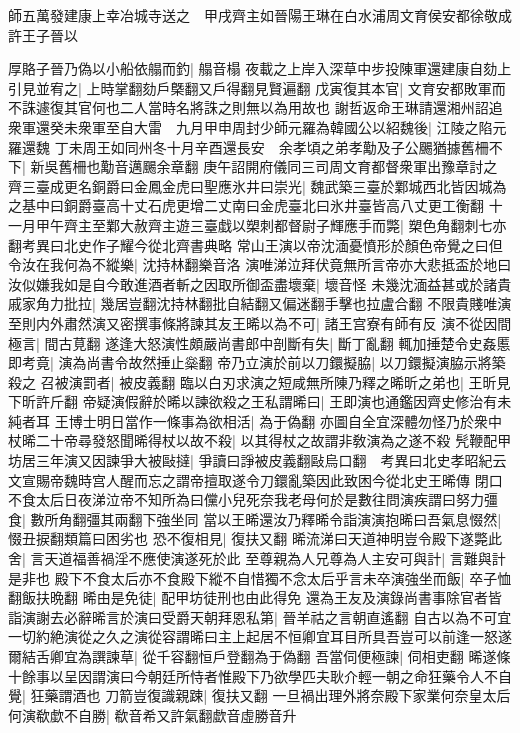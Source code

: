 師五萬發建康上幸冶城寺送之　甲戌齊主如晉陽王琳在白水浦周文育侯安都徐敬成許王子晉以

厚賂子晉乃偽以小船依䑽而釣|{
	䑽音榻}
夜載之上岸入深草中步投陳軍還建康自劾上引見並宥之|{
	上時掌翻劾戶槩翻又戶得翻見賢遍翻}
戊寅復其本官|{
	文育安都敗軍而不誅遽復其官何也二人當時名將誅之則無以為用故也}
謝哲返命王琳請還湘州詔追衆軍還癸未衆軍至自大雷　九月甲申周封少師元羅為韓國公以紹魏後|{
	江陵之陷元羅還魏}
丁未周王如同州冬十月辛酉還長安　余孝頃之弟孝勱及子公颺猶據舊柵不下|{
	新吳舊柵也勱音邁颺余章翻}
庚午詔開府儀同三司周文育都督衆軍出豫章討之　齊三臺成更名銅爵曰金鳳金虎曰聖應氷井曰崇光|{
	魏武築三臺於鄴城西北皆因城為之基中曰銅爵臺高十丈石虎更增二丈南曰金虎臺北曰氷井臺皆高八丈更工衡翻}
十一月甲午齊主至鄴大赦齊主遊三臺戱以槊刺都督尉子輝應手而斃|{
	槊色角翻刺七亦翻考異曰北史作子耀今從北齊書典略}
常山王演以帝沈湎憂憤形於顏色帝覺之曰但令汝在我何為不縱樂|{
	沈持林翻樂音洛}
演唯涕泣拜伏竟無所言帝亦大悲抵盃於地曰汝似嫌我如是自今敢進酒者斬之因取所御盃盡壞棄|{
	壞音怪}
未幾沈湎益甚或於諸貴戚家角力批拉|{
	幾居豈翻沈持林翻批自結翻又偏迷翻手擊也拉盧合翻}
不限貴賤唯演至則内外肅然演又密撰事條將諫其友王晞以為不可|{
	諸王宫寮有師有反}
演不從因間極言|{
	間古莧翻}
遂逢大怒演性頗嚴尚書郎中剖斷有失|{
	斷丁亂翻}
輒加捶楚令史姦慝即考竟|{
	演為尚書令故然捶止橤翻}
帝乃立演於前以刀鐶擬脇|{
	以刀鐶擬演脇示將築殺之}
召被演罰者|{
	被皮義翻}
臨以白刃求演之短咸無所陳乃釋之晞昕之弟也|{
	王昕見下昕許斤翻}
帝疑演假辭於晞以諫欲殺之王私謂晞曰|{
	王即演也通鑑因齊史修治有未純者耳}
王博士明日當作一條事為欲相活|{
	為于偽翻}
亦圖自全宜深體勿怪乃於衆中杖晞二十帝尋發怒聞晞得杖以故不殺|{
	以其得杖之故謂非敎演為之遂不殺}
髠鞭配甲坊居三年演又因諫爭大被敺撻|{
	爭讀曰諍被皮義翻敺烏口翻　考異曰北史孝昭紀云文宣賜帝魏時宫人醒而忘之謂帝擅取遂令刀鐶亂築因此致困今從北史王晞傳}
閉口不食太后日夜涕泣帝不知所為曰儻小兒死奈我老母何於是數往問演疾謂曰努力彊食|{
	數所角翻彊其兩翻下強坐同}
當以王晞還汝乃釋晞令詣演演抱晞曰吾氣息惙然|{
	惙丑捩翻類篇曰困劣也}
恐不復相見|{
	復扶又翻}
晞流涕曰天道神明豈令殿下遂斃此舍|{
	言天道福善禍淫不應使演遂死於此}
至尊親為人兄尊為人主安可與計|{
	言難與計是非也}
殿下不食太后亦不食殿下縱不自惜獨不念太后乎言未卒演強坐而飯|{
	卒子恤翻飯扶晩翻}
晞由是免徒|{
	配甲坊徒刑也由此得免}
還為王友及演錄尚書事除官者皆詣演謝去必辭晞言於演曰受爵天朝拜恩私第|{
	晉羊祜之言朝直遙翻}
自古以為不可宜一切約絶演從之久之演從容謂晞曰主上起居不恒卿宜耳目所具吾豈可以前逢一怒遂爾結舌卿宜為譔諫草|{
	從千容翻恒戶登翻為于偽翻}
吾當伺便極諫|{
	伺相吏翻}
晞遂條十餘事以呈因謂演曰今朝廷所恃者惟殿下乃欲學匹夫耿介輕一朝之命狂藥令人不自覺|{
	狂藥謂酒也}
刀箭豈復識親踈|{
	復扶又翻}
一旦禍出理外將奈殿下家業何奈皇太后何演欷歔不自勝|{
	欷音希又許氣翻歔音虛勝音升}

